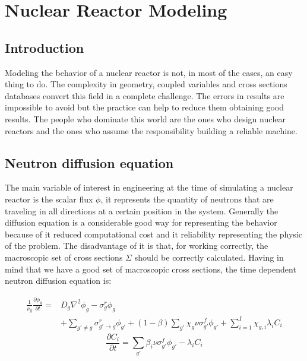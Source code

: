 \chapter{Nuclear Reactor Modeling}

\section{Introduction}


\par
Modeling the behavior of a nuclear reactor is not, in most of the cases, an easy thing to do. The complexity in geometry, coupled variables and cross sections databases convert this field in a complete challenge. The errors in results are impossible to avoid but the practice can help to reduce them obtaining good results. The people who dominate this world are the ones who design nuclear reactors and the ones who assume the responsibility building a reliable machine.

\section{Neutron diffusion equation}

The main variable of interest in engineering at the time of simulating a nuclear reactor is the scalar flux $\phi$, it represents the quantity of neutrons that are traveling in all directions at a certain position in the system. Generally the diffusion equation is a considerable good way for representing the behavior because of it reduced computational cost and it reliability representing the physic of the problem. The disadvantage of it is that, for working correctly, the macroscopic set of cross sections $\Sigma$ should be correctly calculated. Having in mind that we have a good set of macroscopic cross sections, the time dependent neutron diffusion equation is:

\begin{equation}
\begin{split}
\frac{1}{\nu_{g}}\frac{\partial \phi_{g}}{\partial t}   =  &         
D_{g} \nabla^{2}                                                      \phi_{g} 
-\sigma_{g}^{r}                                                       \phi_{g} \\
& + \sum_{g\prime\neq g} \sigma_{g'\rightarrow g }^{r}                  \phi_{g\prime} 
+ (1-\beta)\sum_{g\prime} \chi_{g}\nu\sigma_{g'}^{f}                  \phi_{g\prime}   
+ \sum_{i=1}^{I} \chi_{g,i}\lambda_{i} C_{i} 
\end{split} 
\end{equation}
\begin{equation}
\frac{\partial C_{i}}{\partial t}   = \sum_{g\prime}\beta_{i} \nu \sigma_{g'}^{f} \phi_{g\prime} - \lambda_{i} C_{i}
\end{equation}

